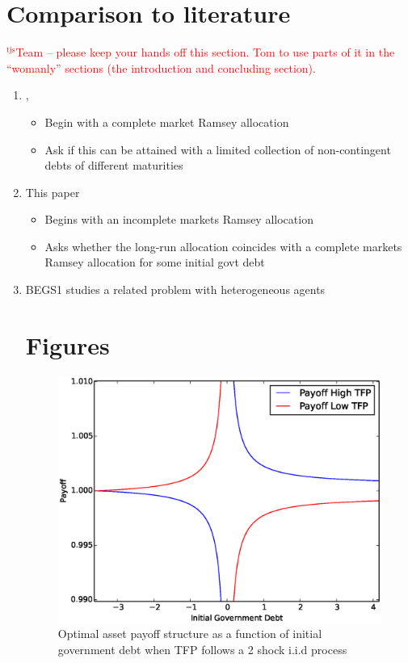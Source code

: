 \documentclass[12pt]{article}
\newcommand{\tjs}[1]{\textcolor{red}{$^{\textrm{tjs}}${#1}}}
\begin{document}
\section{Comparison to literature}
\tjs{Team -- please keep your hands off this section. Tom to use parts of it in the ``womanly'' sections (the introduction and
concluding section).}

 \begin{enumerate}
  \item \citet{Angeletos}, \citet{Buera_Nicolini}

\begin{itemize}
 \item Begin with a complete market  Ramsey allocation
 \item Ask if this can be attained with a limited  collection of non-contingent debts of different maturities
\end{itemize}
\item This paper
\begin{itemize}
 \item Begins with an incomplete markets Ramsey allocation
 \item Asks whether the long-run allocation coincides with a complete markets Ramsey allocation for some initial govt debt
\end{itemize}

\item BEGS1 studies a related problem with heterogeneous agents


\section{Figures}

\begin{figure}
		\begin{center}
		\includegraphics[scale=.4]{Images/p_graph_tfp.eps}
		\caption{Optimal asset payoff structure as a function of initial government debt when TFP follows a 2 shock i.i.d process}
	\end{center}	
	\end{figure}



\end{enumerate}
\end{document}
